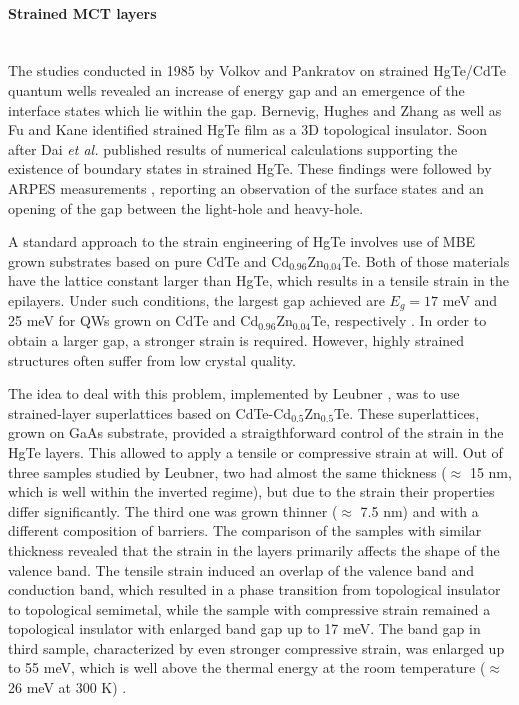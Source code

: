 \documentclass[titlepage,a4paper]{book}
\newcommand{\wciecie}{\quad\phantom{v}}
\newcommand{\myparagraph}[1]{\paragraph{#1}\mbox{}\\}
\begin{document}
\myparagraph{Strained MCT layers}
\wciecie
The studies conducted in 1985 by Volkov and Pankratov \cite{Volkow_strainedMCT} on strained HgTe/CdTe quantum wells revealed an increase of energy gap and an emergence of the interface states which lie within the gap. Bernevig, Hughes and Zhang \cite{Bernevig_Topology2} as well as Fu and Kane \cite{Kane_Fu} identified strained HgTe film as a 3D topological insulator. Soon after Dai \textit{et al.} \cite{Dai_MCT_layers} published results of numerical calculations supporting the existence of boundary states in strained HgTe. These findings were followed by ARPES measurements \cite{Brune_State} \cite{Crauste_StrainedMCT}, reporting an observation of the surface states and an opening of the gap between the light-hole and heavy-hole.
 
A standard approach to the strain engineering of HgTe involves use of MBE grown substrates based on pure CdTe and Cd$_{0.96}$Zn$_{0.04}$Te. Both of those materials have the lattice constant larger than HgTe, which results in a tensile strain in the epilayers. Under such conditions, the largest gap achieved are $E_g = 17$ meV and 25 meV for QWs grown on CdTe and Cd$_{0.96}$Zn$_{0.04}$Te, respectively \cite{Pfeuffer_State}. In order to obtain a larger gap, a stronger strain is required. However, highly strained structures often suffer from low crystal quality. 

The idea to deal with this problem, implemented by Leubner \cite{Leubner_State}, was to use strained-layer superlattices based on CdTe-Cd$_{0.5}$Zn$_{0.5}$Te. These superlattices, grown on GaAs substrate, provided a straigthforward control of the strain in the HgTe layers. This allowed to apply a tensile or compressive strain at will. Out of three samples studied by Leubner, two had almost the same thickness ($\approx$ 15 nm, which is well within the inverted regime), but due to the strain their properties differ significantly. The third one was grown thinner ($\approx$ 7.5 nm) and with a different composition of barriers. The comparison of the samples with similar thickness revealed that the strain in the layers primarily affects the shape of the valence band. The tensile strain induced an overlap of the valence band and conduction band, which resulted in a phase transition from topological insulator to topological semimetal, while the sample with compressive strain remained a topological insulator with enlarged band gap up to 17 meV. The band gap in third sample, characterized by even stronger compressive strain, was enlarged up to 55 meV, which is well above the thermal energy at the room temperature ($\approx$ 26 meV at 300 K) \cite{Leubner_State}. 
\end{document}
